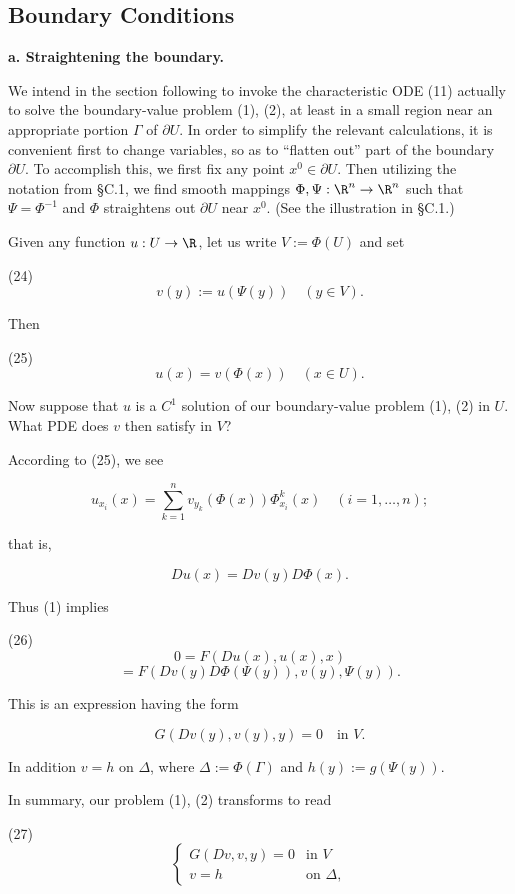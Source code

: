 \subsection{Boundary Conditions}
\label{sec:characteristics-boundary-conditions}

\textbf{a. Straightening the boundary.}

We intend in the section following to invoke the characteristic ODE (11) actually to solve the boundary-value problem (1), (2), at least in a small region near an appropriate portion $\Gamma$ of $\partial U$. In order to simplify the relevant calculations, it is convenient first to change variables, so as to ``flatten out'' part of the boundary $\partial U$. To accomplish this, we first fix any point $x^0 \in \partial U$. Then utilizing the notation from \S C.1, we find smooth mappings $\Phi, \Psi : \R^n \to \R^n$ such that $\Psi = \Phi^{-1}$ and $\Phi$ straightens out $\partial U$ near $x^0$. (See the illustration in \S C.1.)

Given any function $u : U \to \R$, let us write $V := \Phi(U)$ and set

(24)
$$v(y) := u(\Psi(y)) \quad (y \in V).$$

Then

(25)
$$u(x) = v(\Phi(x)) \quad (x \in U).$$

Now suppose that $u$ is a $C^1$ solution of our boundary-value problem (1), (2) in $U$. What PDE does $v$ then satisfy in $V$?

According to (25), we see

$$u_{x_i}(x) = \sum_{k=1}^n v_{y_k}(\Phi(x))\Phi^k_{x_i}(x) \quad (i = 1,\ldots,n);$$

that is,

$$Du(x) = Dv(y)D\Phi(x).$$

Thus (1) implies

(26)
$$0 = F(Du(x), u(x), x)$$
$$= F(Dv(y)D\Phi(\Psi(y)), v(y), \Psi(y)).$$

This is an expression having the form

$$G(Dv(y), v(y), y) = 0 \quad \text{in } V.$$

In addition $v = h$ on $\Delta$, where $\Delta := \Phi(\Gamma)$ and $h(y) := g(\Psi(y))$.

In summary, our problem (1), (2) transforms to read

(27)
$$\begin{cases}
G(Dv, v, y) = 0 & \text{in } V \\
v = h & \text{on } \Delta,
\end{cases}$$

